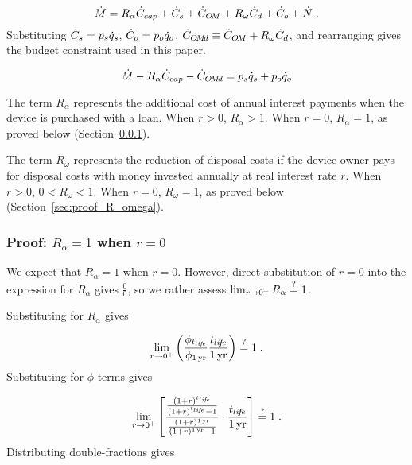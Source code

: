 \begin{equation}
  \dot{M} = R_\alpha \dot{C}_{cap} + 
             \dot{C}_s + 
             \dot{C}_{O\!M} + 
             R_\omega \dot{C}_d + 
             \dot{C}_o + 
             \dot{N} \; .
\end{equation}
%
Substituting $\dot{C}_s = p_s \dot{q}_s$,  
$\dot{C}_o = p_o \dot{q}_o$, $\dot{C}_{O\!M\!d} \equiv \dot{C}_{O\!M} + R_\omega \dot{C}_d$, and rearranging gives
the budget constraint used in this paper.

\begin{equation}
  \dot{M} - R_\alpha \dot{C}_{cap} - \dot{C}_{O\!M\!d} = p_s \dot{q}_s + p_o \dot{q}_o
\end{equation}

The term $R_\alpha$ represents the additional cost of annual interest
payments when the device is purchased with a loan.
When $r > 0$, $R_\alpha > 1$.
When $r = 0$, $R_\alpha = 1$, as proved below
(Section~\ref{sec:proof_R_alpha}).

The term $R_\omega$ represents the reduction of disposal costs 
if the device owner pays for disposal costs with money
invested annually at real interest rate $r$. 
When $r > 0$, $0 < R_\omega < 1$.
When $r = 0$, $R_\omega = 1$, as proved below
(Section~\ref{sec:proof_R_omega}).


\subsubsection{Proof: $R_\alpha = 1$ when $r = 0$}
\label{sec:proof_R_alpha}

We expect that $R_\alpha = 1$ when $r = 0$.
However, direct substitution of $r = 0$ into the expression
for $R_\alpha$ gives $\frac{0}{0}$, 
so we rather assess
$\lim_{r \to 0^+} R_\alpha \stackrel{?}{=} 1$.

Substituting for $R_\alpha$ gives

\begin{equation}
  \lim_{r \to 0^+} \left( \frac{\phi_{t_{li\!f\!e}}}{\phi_{1\,\mathrm{yr}}} \frac{t_{li\!f\!e}}{1\,\mathrm{yr}} \right) 
  \stackrel{?}{=} 1 \; .
\end{equation}
%
Substituting for $\phi$ terms gives

\begin{equation}
  \lim_{r \to 0^+} \left[ \frac{\frac{(1 + r)^{t_{li\!f\!e}}}{(1 + r)^{t_{li\!f\!e}} - 1}}{\frac{(1 + r)^{1\,\mathrm{yr}}}{(1 + r)^{1\,\mathrm{yr}} - 1}} \cdot \frac{t_{li\!f\!e}}{1\,\mathrm{yr}} \right] \stackrel{?}{=} 1 \; .
\end{equation}
%
Distributing double-fractions gives

